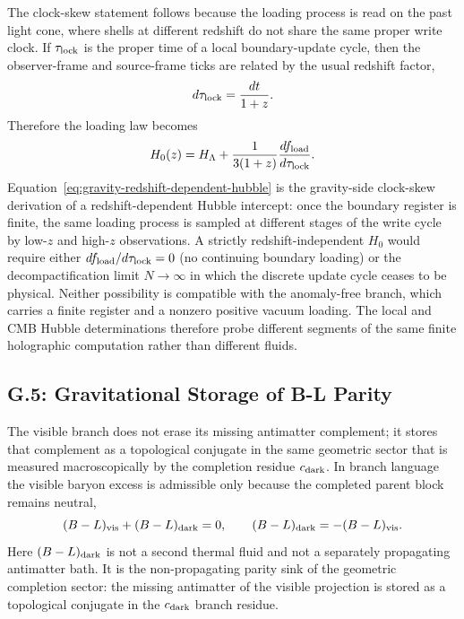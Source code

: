 \documentclass[11pt]{article}
\begin{document}
The clock-skew statement follows because the loading process is read on the
past light cone, where shells at different redshift do not share the same
proper write clock. If $\tau_{\rm lock}$ is the proper time of a local
boundary-update cycle, then the observer-frame and source-frame ticks are
related by the usual redshift factor,
\begin{equation}
\label{eq:gravity-clock-skew}
 d\tau_{\rm lock} = \frac{dt}{1+z}.
\end{equation}
Therefore the loading law becomes
\begin{equation}
\label{eq:gravity-redshift-dependent-hubble}
 H_0(z)
 =
 H_{\Lambda}
 +
 \frac{1}{3(1+z)}\frac{d f_{\rm load}}{d\tau_{\rm lock}}.
\end{equation}
Equation~\eqref{eq:gravity-redshift-dependent-hubble} is the gravity-side
clock-skew derivation of a redshift-dependent Hubble intercept: once the
boundary register is finite, the same loading process is sampled at different
stages of the write cycle by low-$z$ and high-$z$ observations. A strictly
redshift-independent $H_0$ would require either
$df_{\rm load}/d\tau_{\rm lock}=0$ (no continuing boundary loading) or the
decompactification limit $N\to\infty$ in which the discrete update cycle
ceases to be physical. Neither possibility is compatible with the anomaly-free
branch, which carries a finite register and a nonzero positive vacuum loading.
The local and CMB Hubble determinations therefore probe different segments of
the same finite holographic computation rather than different fluids.

\subsection*{G.5: Gravitational Storage of B-L Parity}

The visible branch does not erase its missing antimatter complement; it stores
that complement as a topological conjugate in the same geometric sector that is
measured macroscopically by the completion residue $c_{\rm dark}$. In branch
language the visible baryon excess is admissible only because the completed
parent block remains neutral,
\begin{equation}
\label{eq:gravity-parent-neutrality}
 (B-L)_{\rm vis}+(B-L)_{\rm dark}=0,
 \qquad
 (B-L)_{\rm dark}=-(B-L)_{\rm vis}.
\end{equation}
Here $(B-L)_{\rm dark}$ is not a second thermal fluid and not a separately
propagating antimatter bath. It is the non-propagating parity sink of the
geometric completion sector: the missing antimatter of the visible projection
is stored as a topological conjugate in the $c_{\rm dark}$ branch residue.
\end{document}
